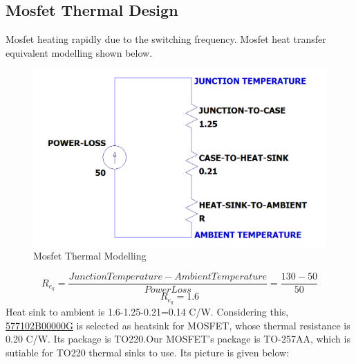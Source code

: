 \documentclass{article}
\begin{document}
\subsection{Mosfet Thermal Design}
Mosfet heating rapidly due to the switching frequency. Mosfet heat transfer equivalent modelling shown below. 
\begin{figure}[H]
    \centering
    \includegraphics[scale=0.4]{MOSFETHEAT.PNG}
    \caption{Mosfet Thermal Modelling}
    \label{fig:my_label}
\end{figure}
\begin{equation}
    R_e_q=\frac{Junction Temperature-Ambient Temperature}{Power Loss}=\frac{130-50}{50}
\end{equation}
\begin{equation}
    R_e_q=1.6
\end{equation}
Heat sink to ambient is 1.6-1.25-0.21=0.14 C/W. Considering this, \href{https://www.boydcorp.com/aavid-datasheets/Board-Level-Cooling-Channel-5770.pdf}{577102B00000G} is selected as heatsink for MOSFET, whose thermal resistance is 0.20 C/W. Its package is TO220.Our MOSFET's package is TO-257AA, which is sutiable for TO220 thermal sinks to use. Its picture is given below:
\end{document}
